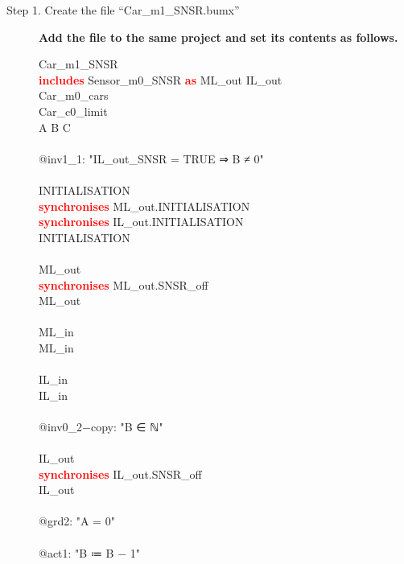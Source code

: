 \begin{description}
	\item[Step 1. Create the file ``Car\_m1\_SNSR.bumx''] \textbf{Add the file to the same project and set its contents as follows.}
	
		\begin{center}
		\begin{Bcode}
			\ifplastex
			\Bmachine{} Car_m1_SNSR\\
			\textcolor{red}{\textbf{includes}} Sensor_m0_SNSR \textcolor{red}{\textbf{as}} ML_out IL_out\\
			\Brefines{} Car_m0_cars\\
			\Bsees{} Car_c0_limit\\
			\Bvariables{} A B C\\
			\Binvariants\\
			@inv1_1: "IL_out_SNSR = TRUE ⇒ B ≠ 0"\\
			\Bevents\\
			INITIALISATION \Bextended\\
			\textcolor{red}{\textbf{synchronises}} ML_out.INITIALISATION\\
			\textcolor{red}{\textbf{synchronises}} IL_out.INITIALISATION\\
			\Brefines{} INITIALISATION\\
			\Bend\\
			ML_out \Bextended\\
			\textcolor{red}{\textbf{synchronises}} ML_out.SNSR_off\\
			\Brefines{} ML_out\\
			\Bend\\
			ML_in \Bextended\\
			\Brefines{} ML_in\\
			\Bend\\
			IL_in \Bextended\\
			\Brefines{} IL_in\\
			\Bwhen\\
			@inv0_2−copy: "B ∈ ℕ" \Btheorem\\
			\Bend\\
			IL_out\\
			\textcolor{red}{\textbf{synchronises}} IL_out.SNSR_off\\
			\Brefines{} IL_out\\
			\Bwhen\\
			@grd2: "A = 0"\\
			\Bthen\\
			@act1: "B ≔ B − 1"\\

\end{Bcode}
\end{center}
\end{description}
